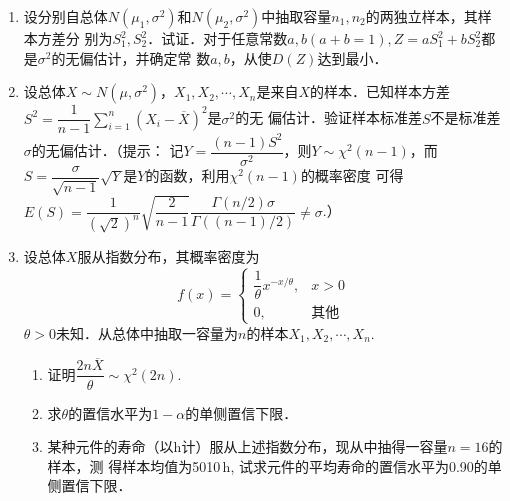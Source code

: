 \documentclass[10pt,a4paper]{article}
\begin{document}
\begin{enumerate}
    \item 设分别自总体$N(\mu_1,\sigma^2)$和$N(\mu_2,\sigma^2)$中抽取容量$n_1,n_2$的两独立样本，其样本方差分
    别为$S_1^2,S_2^2$．试证．对于任意常数$a,b(a+b=1),Z=aS_1^2+bS_2^2$都是$\sigma^2$的无偏估计，并确定常
    数$a,b$，从使$D(Z)$达到最小．





    \item 设总体$X\sim N(\mu,\sigma^2)$，$X_1,X_2,\cdots,X_n$是来自$X$的样本．已知样本方差$S^2=\dfrac{1}{n-1}\displaystyle{\sum ^n_{i=1} (X_i-\overline{X})^2}$是$\sigma^2$的无
    偏估计．验证样本标准差$S$不是标准差$\sigma$的无偏估计．（提示：
    记$Y=\dfrac{(n-1)S^2}{\sigma^2}$，则$Y\sim \chi^2(n-1)$，而$S=\dfrac{\sigma}{\sqrt{n-1}}\sqrt{Y}$是$Y$的函数，利用$\chi^2(n-1)$的概率密度
    可得$E(S)=\dfrac{1}{(\sqrt{2})^n}\sqrt{\dfrac{2}{n-1}}\dfrac{\Gamma(n/2)\sigma}{\Gamma((n-1)/2)}\neq \sigma$.）
    





    \item 设总体$X$服从指数分布，其概率密度为
    $$f(x)=\left\{\begin{array}{ll}
        \dfrac{1}{\theta}x^{-x/\theta}, &  x>0\\
        0, & \mbox{其他}
    \end{array}\right.$$
    $\theta>0$未知．从总体中抽取一容量为$n$的样本$X_1,X_2,\cdots,X_n$.
    \begin{enumerate}
        \item 证明$\dfrac{2n\overline{X}}{\theta}\sim \chi^2(2n)$.
        \item 求$\theta$的置信水平为$1-\alpha$的单侧置信下限．
        \item 某种元件的寿命（以h计）服从上述指数分布，现从中抽得一容量$n=16$的样本，测
        得样本均值为5010$\, $h, 试求元件的平均寿命的置信水平为0.90的单侧置信下限．
    \end{enumerate}





\end{enumerate}
\end{document}
